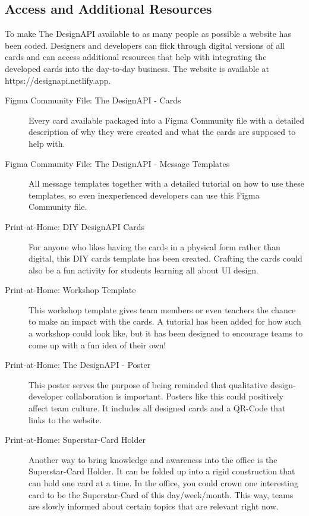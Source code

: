 \newpage
\subsection{Access and Additional Resources}
To make The DesignAPI available to as many people as possible a website has been coded.
Designers and developers can flick through digital versions of all cards and can access additional
resources that help with integrating the developed cards into the day-to-day business. The website
is available at https://designapi.netlify.app. 

\begin{description}
    \item[Figma Community File: The DesignAPI - Cards] Every card available packaged into a Figma
    Community file with a detailed description of why they were created and what the cards are
    supposed to help with.
    \item[Figma Community File: The DesignAPI - Message Templates] All message templates together
    with a detailed tutorial on how to use these templates, so even inexperienced developers can use
    this Figma Community file.
    \item[Print-at-Home: DIY DesignAPI Cards] For anyone who likes having the cards in a physical
    form rather than digital, this DIY cards template has been created. Crafting the cards could
    also be a fun activity for students learning all about UI design.
    \item[Print-at-Home: Workshop Template] This workshop template gives team members or even
    teachers the chance to make an impact with the cards. A tutorial has been added for how such a
    workshop could look like, but it has been designed to encourage teams to come up with a
    fun idea of their own! 
    \item[Print-at-Home: The DesignAPI - Poster] This poster serves the purpose of being reminded
    that qualitative design-developer collaboration is important. Posters like this could positively
    affect team culture. It includes all designed cards and a QR-Code that links to the website. 
    \item[Print-at-Home: Superstar-Card Holder] Another way to bring knowledge and awareness into
    the office is the Superstar-Card Holder. It can be folded up into a rigid construction that can
    hold one card at a time. In the office, you could crown one interesting card to be the
    Superstar-Card of this day/week/month. This way, teams are slowly informed about certain topics
    that are relevant right now.
\end{description}

